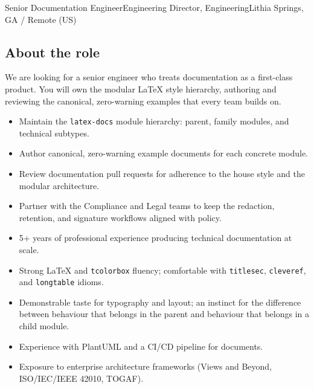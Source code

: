 \documentclass[11pt]{article}
\begin{document}
\makedoctitle
\makedocsummary

\begin{jobdescription}{Senior Documentation Engineer}{Engineering}%
                     {Director, Engineering}{Lithia Springs, GA / Remote (US)}
\end{jobdescription}

\subsection*{About the role}
We are looking for a senior engineer who treats documentation as a
first-class product. You will own the modular LaTeX style hierarchy,
authoring and reviewing the canonical, zero-warning examples that every
team builds on.

\Responsibilities
\begin{itemize}
  \item Maintain the \texttt{latex-docs} module hierarchy: parent,
        family modules, and technical subtypes.
  \item Author canonical, zero-warning example documents for each
        concrete module.
  \item Review documentation pull requests for adherence to the house
        style and the modular architecture.
  \item Partner with the Compliance and Legal teams to keep the
        redaction, retention, and signature workflows aligned with
        policy.
\end{itemize}

\Qualifications
\begin{itemize}
  \item 5+ years of professional experience producing technical
        documentation at scale.
  \item Strong LaTeX and \texttt{tcolorbox} fluency; comfortable with
        \texttt{titlesec}, \texttt{cleveref}, and \texttt{longtable}
        idioms.
  \item Demonstrable taste for typography and layout; an instinct for
        the difference between behaviour that belongs in the parent and
        behaviour that belongs in a child module.
\end{itemize}

\NiceToHaves
\begin{itemize}
  \item Experience with PlantUML and a CI/CD pipeline for documents.
  \item Exposure to enterprise architecture frameworks (Views and
        Beyond, ISO/IEC/IEEE 42010, TOGAF).
\end{itemize}
\end{document}
